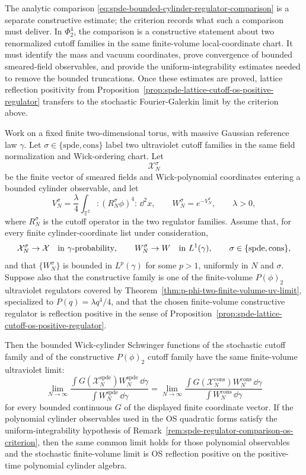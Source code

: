 The analytic comparison
\eqref{eq:spde-bounded-cylinder-regulator-comparison} is a separate
constructive estimate; the criterion records what such a comparison must
deliver.  In \(\Phi^4_2\), the comparison is a constructive statement about
two renormalized cutoff families in the same finite-volume local-coordinate
chart.  It must identify the mass and vacuum coordinates, prove convergence
of bounded smeared-field observables, and provide the uniform-integrability
estimates needed to remove the bounded truncations.  Once these estimates are
proved, lattice reflection positivity from
Proposition~\ref{prop:spde-lattice-cutoff-os-positive-regulator} transfers to
the stochastic Fourier-Galerkin limit by the criterion above.

\begin{proposition}
\label{prop:spde-phi-four-two-finite-volume-route-identification}
Work on a fixed finite two-dimensional torus, with massive Gaussian reference
law \(\gamma\).  Let
\(\sigma\in\{\mathrm{spde},\mathrm{cons}\}\) label two ultraviolet cutoff
families in the same field normalization and Wick-ordering chart.  Let
\[
  \mathcal X_N^\sigma
\]
be the finite vector of smeared fields and Wick-polynomial coordinates entering
a bounded cylinder observable, and let
\[
  V_N^\sigma
  =
  \frac{\lambda}{4}
  \int_{\mathbb T^2}:\!(R_N^\sigma\phi)^4\!:\,\dd^2x,
  \qquad
  W_N^\sigma=e^{-V_N^\sigma},
  \qquad \lambda>0,
\]
where \(R_N^\sigma\) is the cutoff operator in the two regulator families.
Assume that, for every finite cylinder-coordinate list under consideration,
\[
  \mathcal X_N^\sigma\to\mathcal X
  \quad\hbox{in }\gamma\hbox{-probability},
  \qquad
  W_N^\sigma\to W
  \quad\hbox{in }L^1(\gamma),
  \qquad \sigma\in\{\mathrm{spde},\mathrm{cons}\},
\]
and that \(\{W_N^\sigma\}\) is bounded in \(L^p(\gamma)\) for some \(p>1\),
uniformly in \(N\) and \(\sigma\).  Suppose also that the constructive family
is one of the finite-volume \(P(\phi)_2\) ultraviolet regulators covered by
Theorem~\ref{thm:p-phi-two-finite-volume-uv-limit}, specialized to
\(P(q)=\lambda q^4/4\), and that the chosen finite-volume constructive
regulator is reflection positive in the sense of
Proposition~\ref{prop:spde-lattice-cutoff-os-positive-regulator}.

Then the bounded Wick-cylinder Schwinger functions of the stochastic cutoff
family and of the constructive \(P(\phi)_2\) cutoff family have the same
finite-volume ultraviolet limit:
\[
  \lim_{N\to\infty}
  \frac{\int G(\mathcal X_N^{\mathrm{spde}})W_N^{\mathrm{spde}}\,\dd\gamma}
       {\int W_N^{\mathrm{spde}}\,\dd\gamma}
  =
  \lim_{N\to\infty}
  \frac{\int G(\mathcal X_N^{\mathrm{cons}})W_N^{\mathrm{cons}}\,\dd\gamma}
       {\int W_N^{\mathrm{cons}}\,\dd\gamma}
\]
for every bounded continuous \(G\) of the displayed finite coordinate vector.
If the polynomial cylinder observables used in the OS quadratic forms satisfy
the uniform-integrability hypothesis of
Remark~\ref{rem:spde-regulator-comparison-os-criterion}, then the same common
limit holds for those polynomial observables and the stochastic finite-volume
limit is OS reflection positive on the positive-time polynomial cylinder
algebra.


\end{proposition}
